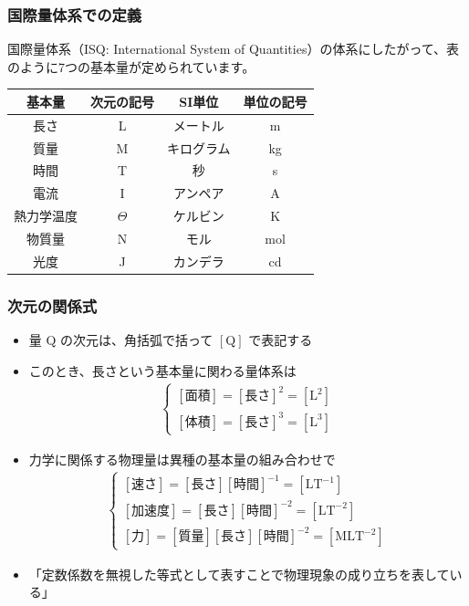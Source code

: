 \documentclass[unicode,12pt,aspectratio=169]{beamer}
\begin{document}
\begin{frame}
	\frametitle{国際量体系での定義}

	国際量体系（ISQ: International System of Quantities）の体系にしたがって、表のように7つの基本量が定められています。
	\begin{center}
		\begin{tabular}{|c|c||c|c|} \hline
			基本量 		& 次元の記号 & SI単位 		& 単位の記号\\ \hline \hline
			長さ		& L			& メートル 		& m \\ \hline
			質量		& M			& キログラム 	& kg \\ \hline
			時間		& T			& 秒 			& s \\ \hline
			電流		& I			& アンペア 		& A \\ \hline
			熱力学温度	& $\Theta$	& ケルビン 		& K \\ \hline
			物質量		& N			& モル 			& mol \\ \hline
			光度		& J			& カンデラ 		& cd \\ \hline
		\end{tabular}
	\end{center}
\end{frame}

\begin{frame}
	\frametitle{次元の関係式}
	\footnotesize
	\begin{itemize}
		\item 量 $\mathrm{Q}$ の次元は、角括弧で括って $[\mathrm{Q}]$ で表記する
		\item このとき、長さという基本量に関わる量体系は
			\begin{align*}
				\begin{cases}
					[\text{面積}] = [\text{長さ}]^2 = [\mathrm{L}^2] \\[8pt]
					[\text{体積}] = [\text{長さ}]^3 = [\mathrm{L}^3]
				\end{cases}
			\end{align*}
		\item 力学に関係する物理量は異種の基本量の組み合わせで
			\begin{align*}
				\begin{cases}
					[\text{速さ}] = [\text{長さ}][\text{時間}]^{-1} = [\mathrm{LT}^{-1}] \\[8pt]
					[\text{加速度}] = [\text{長さ}][\text{時間}]^{-2} = [\mathrm{LT}^{-2}] \\[8pt]
					[\text{力}] = [\text{質量}][\text{長さ}][\text{時間}]^{-2} = [\mathrm{MLT}^{-2}]
				\end{cases}
				\label{eq:idou}
			\end{align*}
		\item 「定数係数を無視した等式として表すことで物理現象の成り立ちを表している」
	\end{itemize}
\end{frame}
\end{document}
